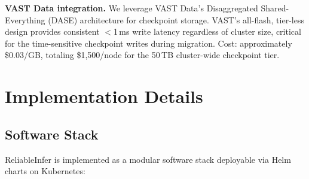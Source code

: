 \documentclass[conference,10pt,letterpaper]{IEEEtran}
\begin{document}
\begin{table}[!t]
\caption{Checkpoint Storage Sizing}
\label{tab:storage}
\centering\scriptsize
{}
\end{table}

\textbf{VAST Data integration.} We leverage VAST Data's Disaggregated Shared-Everything (DASE) architecture for checkpoint storage. VAST's all-flash, tier-less design provides consistent $<$1\,ms write latency regardless of cluster size, critical for the time-sensitive checkpoint writes during migration. Cost: approximately \$0.03/GB, totaling \$1,500/node for the 50\,TB cluster-wide checkpoint tier.


\section{Implementation Details}
\label{sec:impl}

\subsection{Software Stack}

ReliableInfer is implemented as a modular software stack deployable via Helm charts on Kubernetes:
\end{document}
